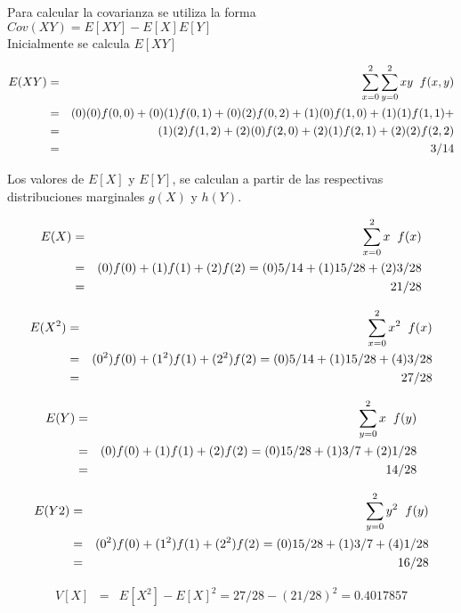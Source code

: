 \documentclass[base=hide,12pt]{elegantbook}
\begin{document}
Para  calcular la covarianza se utiliza la  forma $Cov(XY)=E[XY]-E[X]E[Y]$ \\

Inicialmente se calcula $E[XY]$ 

\begin{eqnarray*}
	E(XY)&=&\sum\limits_{x=0}^{2}\sum\limits_{y=0}^{2}xy \hspace{.2cm}f(x,y)\\
	&=&(0)(0)f(0,0)+(0)(1)f(0,1)+(0)(2)f(0,2)+(1)(0)f(1,0)+(1)(1)f(1,1)+\\
	&=&(1)(2)f(1,2)+(2)(0)f(2,0)+(2)(1)f(2,1)+(2)(2)f(2,2)\\
	&=&3/14 
\end{eqnarray*}

Los valores de $E[X]$ y $E[Y]$, se calculan a  partir de  las respectivas distribuciones marginales $g(X)$ y $h(Y)$.

\begin{eqnarray*}
	E(X)&=&\sum\limits_{x=0}^{2}x  \hspace{.2cm}f(x)\\
	&=&(0)f(0)+(1)f(1)+(2)f(2) =  (0)5/14+(1) 15/28 +(2) 3/28 \\
	&=& 21/28
\end{eqnarray*}

\begin{eqnarray*}
	E(X^{2})&=&\sum\limits_{x=0}^{2}x^{2}  \hspace{.2cm}f(x)\\
	&=&(0^{2})f(0)+(1^{2})f(1)+(2^{2})f(2) =  (0)5/14+(1) 15/28 +(4) 3/28 \\
	&=& 27/28
\end{eqnarray*}


\begin{eqnarray*}
	E(Y)&=&\sum\limits_{y=0}^{2}x  \hspace{.2cm}f(y)\\
	&=&(0)f(0)+(1)f(1)+(2)f(2) = (0)15/28+(1) 3/7 +(2) 1/28 \\
	&=& 14/28
\end{eqnarray*}	

\begin{eqnarray*}
	E(Y {2})&=&\sum\limits_{y=0}^{2}y^{2}  \hspace{.2cm}f(y)\\
	&=&(0^{2})f(0)+(1^{2})f(1)+(2^{2})f(2) = (0)15/28+(1) 3/7 +(4) 1/28 \\
	&=& 16/28
\end{eqnarray*}


\begin{eqnarray*}
	V[X]&=&E[X^{2}]-E[X]^{2}= 27/28 - (21/28)^{2} = 0.4017857
\end{eqnarray*}	
\end{document}
